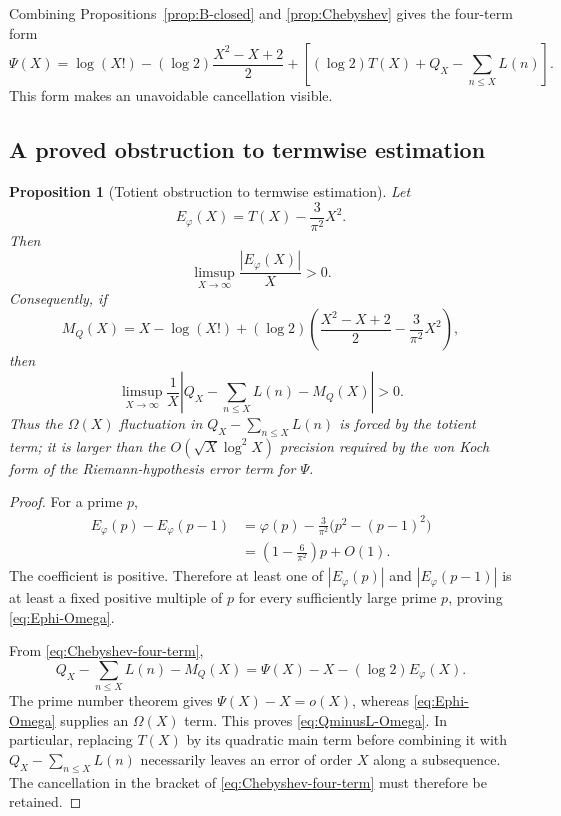 \documentclass[11pt]{amsart}
\numberwithin{equation}{section}
\newtheorem{proposition}[theorem]{Proposition}
\theoremstyle{definition}
\theoremstyle{remark}
\begin{document}
Combining Propositions~\ref{prop:B-closed} and \ref{prop:Chebyshev} gives
the four-term form
\begin{equation}\label{eq:Chebyshev-four-term}
 \Psi(X)=\log(X!)-(\log2)\frac{X^2-X+2}{2}
 +\left[(\log2)T(X)+Q_X-\sum_{n\leq X}L(n)\right].
\end{equation}
This form makes an unavoidable cancellation visible.

\subsection{A proved obstruction to termwise estimation}

\begin{proposition}[Totient obstruction to termwise estimation]
\label{prop:totient-obstruction}
Let
\begin{equation}\label{eq:Ephi}
 E_\varphi(X)=T(X)-\frac3{\pi^2}X^2.
\end{equation}
Then
\begin{equation}\label{eq:Ephi-Omega}
 \limsup_{X\to\infty}\frac{|E_\varphi(X)|}{X}>0.
\end{equation}
Consequently, if
\begin{equation}\label{eq:MQ}
 M_Q(X)=X-\log(X!)+(\log2)
 \left(\frac{X^2-X+2}{2}-\frac3{\pi^2}X^2\right),
\end{equation}
then
\begin{equation}\label{eq:QminusL-Omega}
 \limsup_{X\to\infty}\frac1X
 \left|Q_X-\sum_{n\leq X}L(n)-M_Q(X)\right|>0.
\end{equation}
Thus the \(\Omega(X)\) fluctuation in
\(Q_X-\sum_{n\leq X}L(n)\) is forced by the totient term; it is larger
than the \(O(\sqrt X\log^2X)\) precision required by the von Koch form of
the Riemann-hypothesis error term for \(\Psi\).
\end{proposition}

\begin{proof}
For a prime \(p\),
\begin{align*}
 E_\varphi(p)-E_\varphi(p-1)
 &=\varphi(p)-\frac3{\pi^2}\bigl(p^2-(p-1)^2\bigr)\\
 &=\left(1-\frac6{\pi^2}\right)p+O(1).
\end{align*}
The coefficient is positive.  Therefore at least one of
\(|E_\varphi(p)|\) and \(|E_\varphi(p-1)|\) is at least a fixed positive
multiple of \(p\) for every sufficiently large prime \(p\), proving
\eqref{eq:Ephi-Omega}.

From \eqref{eq:Chebyshev-four-term},
\begin{equation}\label{eq:QminusL-decomp}
 Q_X-\sum_{n\leq X}L(n)-M_Q(X)
 =\Psi(X)-X-(\log2)E_\varphi(X).
\end{equation}
The prime number theorem gives \(\Psi(X)-X=o(X)\), whereas
\eqref{eq:Ephi-Omega} supplies an \(\Omega(X)\) term.  This proves
\eqref{eq:QminusL-Omega}.  In particular, replacing \(T(X)\) by its
quadratic main term before combining it with
\(Q_X-\sum_{n\leq X}L(n)\) necessarily leaves an error of order \(X\)
along a subsequence.  The cancellation in the bracket of
\eqref{eq:Chebyshev-four-term} must therefore be retained.
\end{proof}
\end{document}
